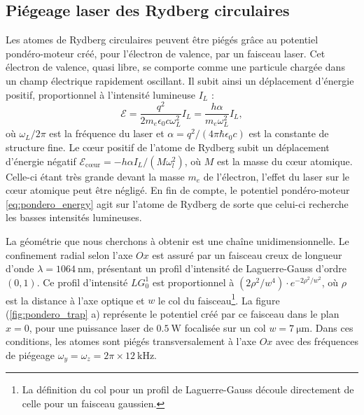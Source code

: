 	\subsection{Piégeage laser des Rydberg circulaires}\label{subsec:circ_laser_trapping}
\noindent Les atomes de Rydberg circulaires peuvent être piégés grâce au potentiel pondéro-moteur créé, pour l'électron de valence, par un faisceau laser.
Cet électron de valence, quasi libre, se comporte comme une particule chargée dans un champ électrique rapidement oscillant.
Il subit ainsi un déplacement d'énergie positif, proportionnel à l'intensité lumineuse $I_L$ \cite{MX_FABRERYDHF76} :
\begin{equation}
\label{eq:pondero_energy}
\mathcal{E} = \frac{q^2}{2m_e \epsilon_0 c \omega_L^2} I_L
= \frac{h\alpha}{m_e\omega_L^2}I_L,
\end{equation}
où $\omega_L/2\pi$ est la fréquence du laser et $\alpha = q^2/(4\pi\hbar\epsilon_0 c)$ est la constante de structure fine.
Le c\oe ur positif de l'atome de Rydberg subit un déplacement d'énergie négatif $\mathcal{E}_{\text{c\oe ur}} = - h\alpha I_L/(M\omega_l^2)$, où $M$ est la masse du c\oe ur atomique.
Celle-ci étant très grande devant la masse $m_e$ de l'électron, l'effet du laser sur le c\oe ur atomique peut être négligé.
En fin de compte, le potentiel pondéro-moteur \eqref{eq:pondero_energy} agit sur l'atome de Rydberg de sorte que celui-ci recherche les basses intensités lumineuses.

La géométrie que nous cherchons à obtenir est une chaîne unidimensionnelle.
Le confinement radial selon l'axe $Ox$ est assuré par un faisceau \og creux \fg{} de longueur d'onde $\lambda=\SI{1064}{\nano\meter}$, présentant un profil d'intensité de Laguerre-Gauss d'ordre $(0,1)$.
Ce profil d'intensité $LG_0^1$ est proportionnel à $(2\rho^2/w^4)\cdot e^{-2\rho^2/w^2}$, où $\rho$ est la distance à l'axe optique et $w$ le col du faisceau\footnote{
La définition du col pour un profil de Laguerre-Gauss découle directement de celle pour un faisceau gaussien.
}.
La figure (\ref{fig:pondero_trap} a) représente le potentiel créé par ce faisceau dans le plan $x=0$, pour une puissance laser de $\SI{0.5}{\watt}$ focalisée sur un col $w=\SI{7}{\um}$.
Dans ces conditions, les atomes sont piégés transversalement à l'axe $Ox$ avec des fréquences de piégeage $\omega_y=\omega_z= 2\pi\times \SI{12}{\kHz}$.

